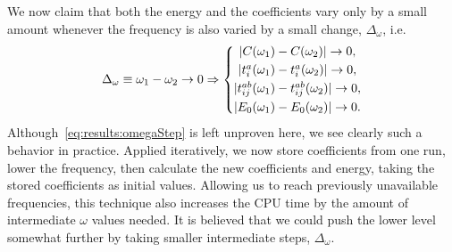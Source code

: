 We now claim that both the energy and the coefficients vary only by a small amount  whenever the frequency is also varied by a small change, $\Delta_{\omega}$, i.e.
\begin{equation}
\label{eq:results:omegaStep}
\Delta_{\omega} \equiv \omega_1 - \omega_2  \rightarrow 0 
\Rightarrow 
\left\lbrace
\begin{matrix}
| C(\omega_1) - C(\omega_2) | \rightarrow 0 , \vspace{1mm}\\
| t_i^a(\omega_1) - t_i^a(\omega_2) | \rightarrow 0 ,\vspace{1mm}\\
| t_{ij}^{ab}(\omega_1) - t_{ij}^{ab}(\omega_2) | \rightarrow 0 ,\vspace{1mm}\\
| E_0(\omega_1) - E_0(\omega_2) | \rightarrow 0 .
\end{matrix}
\right.
\end{equation}
Although~\eqref{eq:results:omegaStep} is left unproven here, we see clearly such a behavior in practice.
Applied iteratively, we now store coefficients from one run, lower the frequency, then calculate the new coefficients and energy, taking the stored coefficients as initial values.
Allowing us to reach previously unavailable frequencies, this technique also increases the CPU time by the amount of intermediate $\omega$ values needed.
It is believed that we could push the lower level somewhat further by taking smaller intermediate steps, $\Delta_{\omega}$.



